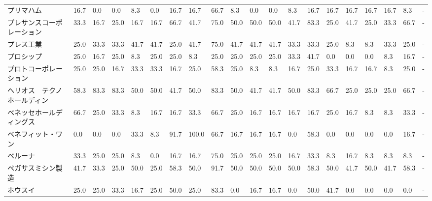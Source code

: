 \documentclass[a4paper，11pt]{jsarticle}
\begin{document}
\begin{longtable}[c]{lp{3mm}p{3mm}p{3mm}p{3mm}p{3mm}p{3mm}p{3mm}p{3mm}p{3mm}p{3mm}p{3mm}p{3mm}p{3mm}p{3mm}p{3mm}p{3mm}p{3mm}p{3mm}p{3mm}}
プリマハム           &   16.7 &    0.0 &       0.0 &       8.3 &        0.0 &   16.7 &   16.7 &   66.7 &     8.3 &     0.0 &    0.0 &   8.3 &   16.7 &    16.7 &    16.7 &  16.7 &  16.7 &   8.3 &     - \\
プレサンスコーポレーション   &   33.3 &   16.7 &      25.0 &      16.7 &       16.7 &   66.7 &   41.7 &   75.0 &    50.0 &    50.0 &   50.0 &  41.7 &   83.3 &    25.0 &    41.7 &  25.0 &  33.3 &  66.7 &     - \\
プレス工業           &   25.0 &   33.3 &      33.3 &      41.7 &       41.7 &   25.0 &   41.7 &   75.0 &    41.7 &    41.7 &   41.7 &  33.3 &   33.3 &    25.0 &     8.3 &   8.3 &  33.3 &  25.0 &     - \\
プロシップ           &   25.0 &   16.7 &      25.0 &       8.3 &       25.0 &   25.0 &    8.3 &   25.0 &    25.0 &    25.0 &   25.0 &  33.3 &   41.7 &     0.0 &     0.0 &   0.0 &   8.3 &  16.7 &     - \\
プロトコーポレーション     &   25.0 &   25.0 &      16.7 &      33.3 &       33.3 &   16.7 &   25.0 &   58.3 &    25.0 &     8.3 &    8.3 &  16.7 &   25.0 &    33.3 &    16.7 &  16.7 &   8.3 &  25.0 &     - \\
ヘリオス　テクノ　ホールディン &   58.3 &   83.3 &      83.3 &      50.0 &       50.0 &   41.7 &   50.0 &   83.3 &    50.0 &    41.7 &   41.7 &  50.0 &   83.3 &    66.7 &    25.0 &  25.0 &  25.0 &  66.7 &     - \\
ベネッセホールディングス    &   66.7 &   25.0 &      33.3 &       8.3 &       16.7 &   16.7 &   33.3 &   66.7 &    25.0 &    16.7 &   16.7 &  16.7 &   16.7 &    25.0 &    16.7 &   8.3 &   8.3 &  33.3 &     - \\
ベネフィット・ワン       &    0.0 &    0.0 &       0.0 &      33.3 &        8.3 &   91.7 &  100.0 &   66.7 &    16.7 &    16.7 &   16.7 &   0.0 &   58.3 &     0.0 &     0.0 &   0.0 &   0.0 &  16.7 &     - \\
ベルーナ            &   33.3 &   25.0 &      25.0 &       8.3 &        0.0 &   16.7 &   16.7 &   75.0 &    25.0 &    25.0 &   25.0 &  16.7 &   33.3 &     8.3 &    16.7 &   8.3 &   8.3 &   8.3 &     - \\
ペガサスミシン製造       &   41.7 &   33.3 &      25.0 &      50.0 &       25.0 &   58.3 &   50.0 &   91.7 &    50.0 &    50.0 &   50.0 &  50.0 &   58.3 &    50.0 &    41.7 &  50.0 &  41.7 &  58.3 &     - \\
ホウスイ            &   25.0 &   25.0 &      33.3 &      16.7 &       25.0 &   50.0 &   25.0 &   83.3 &     0.0 &    16.7 &   16.7 &   0.0 &   50.0 &    41.7 &     0.0 &   0.0 &   0.0 &   0.0 &     - \\

\end{longtable}
\end{document}
